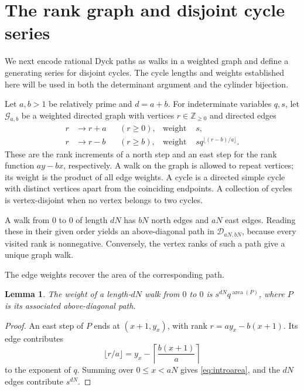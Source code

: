 \documentclass[12pt,reqno]{amsart}
\numberwithin{equation}{section}
\newtheorem{lemma}[theorem]{Lemma}
\theoremstyle{definition}
\theoremstyle{remark}
\theoremstyle{plain}
\newcommand{\NN}{\mathbb Z_{\ge0}}
\DeclareMathOperator{\area}{area}
\newcommand{\Ggraph}{\mathcal G_{a,b}}
\begin{document}
\section{The rank graph and disjoint cycle series}\label{sec:graph}
We next encode rational Dyck paths as walks in a weighted graph and
define a generating series for disjoint cycles.  The cycle lengths and
weights established here will be used in both the determinant argument
and the cylinder bijection.

Let $a,b>1$ be relatively prime and $d=a+b$. For indeterminate variables $q,s$, let $\Ggraph$ be a weighted directed graph with vertices $r\in\NN$ and directed edges
\begin{equation}\label{eq:rankgraphedges}
 \begin{aligned}
 r&\longrightarrow r+a &&(r\ge0),
     &\text{weight }&s,\\
 r&\longrightarrow r-b &&(r\ge b),
     &\text{weight }&s q^{\lfloor(r-b)/a\rfloor}.
 \end{aligned}
\end{equation}
These are the rank increments of a north step and an east step for the rank function
$ay-bx$, respectively. 
A walk on the graph is allowed to repeat vertices; its weight is the product of all edge weights. A cycle is a directed simple cycle
with distinct vertices apart from the coinciding endpoints.
A collection of cycles is vertex-disjoint when no vertex belongs to two cycles.

A walk from $0$ to $0$ of length $dN$ has $bN$ north edges and $aN$
east edges.  Reading these in their given order yields an above-diagonal
path in $\mathcal D_{aN,bN}$, because every visited rank is nonnegative.
Conversely, the vertex ranks of such a path give a unique graph walk.

The edge weights recover the area of the corresponding path.


\begin{lemma}\label{lem:walkarea}
The weight of a length-$dN$ walk from $0$ to $0$ is
$s^{dN}q^{\area(P)}$, where $P$ is its associated above-diagonal path.
\end{lemma}
\begin{proof}
An east step of $P$ ends at $(x+1,y_x)$, with rank
$r=ay_x-b(x+1)$.  Its edge contributes
\[
 \lfloor r/a\rfloor=y_x-\left\lceil\frac{b(x+1)}a\right\rceil
\]
to the exponent of $q$.  Summing over $0\le x<aN$ gives
\eqref{eq:introarea}, and the $dN$ edges contribute $s^{dN}$.
\end{proof}
\end{document}
